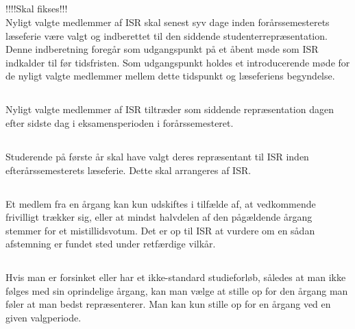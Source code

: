 \documentclass[danish,a4paper,twocolumn]{article}
\begin{document}
\subsection{}
!!!!Skal fikses!!!\\
Nyligt valgte medlemmer af ISR skal senest syv dage inden forårssemesterets
læseferie være valgt og indberettet til den siddende studenterrepræsentation. Denne indberetning foregår som udgangspunkt på et åbent møde som ISR indkalder til før tidsfristen. Som udgangspunkt holdes et introducerende møde for de nyligt valgte medlemmer mellem dette tidspunkt og læseferiens begyndelse. 

\subsection{}
Nyligt valgte medlemmer af ISR tiltræder som siddende repræsentation dagen efter sidste dag i eksamensperioden i forårssemesteret.

\subsection{}
Studerende på første år skal have valgt  deres repræsentant til ISR inden  efterårssemesterets læseferie. Dette skal arrangeres af ISR. 
\subsection{}
Et medlem fra en årgang kan kun udskiftes i tilfælde af, at vedkommende
frivilligt trækker sig, eller at mindst halvdelen af den pågældende årgang stemmer for et mistillidsvotum. Det er op til ISR at vurdere om en sådan afstemning er fundet sted under retfærdige vilkår.
\subsection{}
Hvis man er forsinket eller har et ikke-standard studieforløb, således at man ikke følges med sin oprindelige årgang, kan man vælge at stille op for den årgang man føler at man bedst repræsenterer. Man kan kun stille op for en årgang ved en given valgperiode.
\end{document}
